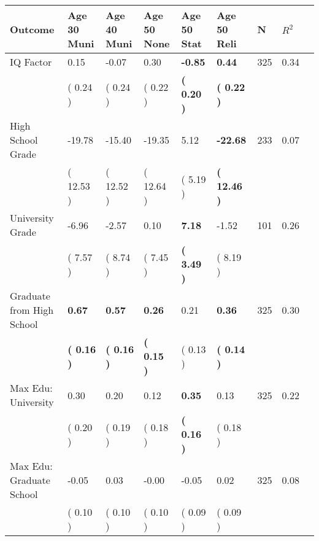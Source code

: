 \begin{tabular}{L{6.2cm} C{1.8cm} C{1.8cm} C{1.8cm} C{1.8cm} C{1.8cm} C{1.8cm} C{0.3cm} C{0.3cm}}
\toprule
 \textbf{Outcome} & \textbf{Age 30 Muni} & \textbf{Age 40 Muni} & \textbf{Age 50 None} & \textbf{Age 50 Stat} & \textbf{Age 50 Reli} & \textbf{N} & \textbf{$ R^2$} \\
\midrule
IQ Factor &      0.15 &     -0.07 &      0.30 & \textbf{    -0.85} & \textbf{     0.44}  & 325 &       0.34 \\ 
 & (     0.24 ) & (     0.24 ) & (     0.22 ) & \textbf{(     0.20 )} & \textbf{(     0.22 )}  & \\
High School Grade &    -19.78 &    -15.40 &    -19.35 &      5.12 & \textbf{   -22.68}  & 233 &       0.07 \\ 
 & (    12.53 ) & (    12.52 ) & (    12.64 ) & (     5.19 ) & \textbf{(    12.46 )}  & \\
University Grade &     -6.96 &     -2.57 &      0.10 & \textbf{     7.18} &     -1.52  & 101 &       0.26 \\ 
 & (     7.57 ) & (     8.74 ) & (     7.45 ) & \textbf{(     3.49 )} & (     8.19 )  & \\
Graduate from High School & \textbf{     0.67} & \textbf{     0.57} & \textbf{     0.26} &      0.21 & \textbf{     0.36}  & 325 &       0.30 \\ 
 & \textbf{(     0.16 )} & \textbf{(     0.16 )} & \textbf{(     0.15 )} & (     0.13 ) & \textbf{(     0.14 )}  & \\
Max Edu: University &      0.30 &      0.20 &      0.12 & \textbf{     0.35} &      0.13  & 325 &       0.22 \\ 
 & (     0.20 ) & (     0.19 ) & (     0.18 ) & \textbf{(     0.16 )} & (     0.18 )  & \\
Max Edu: Graduate School &     -0.05 &      0.03 &     -0.00 &     -0.05 &      0.02  & 325 &       0.08 \\ 
 & (     0.10 ) & (     0.10 ) & (     0.10 ) & (     0.09 ) & (     0.09 )  & \\
\bottomrule
\end{tabular}
